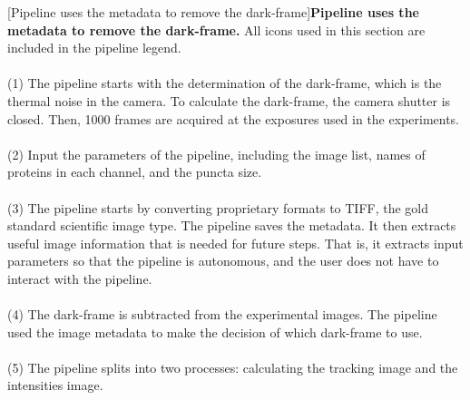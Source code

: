 \begin{centering}
\captionsetup{parbox=none}
[Pipeline uses the metadata to remove the dark-frame]{\textbf{Pipeline uses the metadata to remove the dark-frame.} All icons used in this section are included in the pipeline legend.
\\
\\
(1) The pipeline starts with the determination of the dark-frame, which is the thermal noise in the camera. To calculate the dark-frame, the camera shutter is closed. Then, 1000 frames are acquired at the exposures used in the experiments.
\\
\\
(2) Input the parameters of the pipeline, including the image list, names of proteins in each channel, and the puncta size.
\\
\\
(3) The pipeline starts by converting proprietary formats to TIFF, the gold standard scientific image type. The pipeline saves the metadata. It then extracts useful image information that is needed for future steps. That is, it extracts input parameters so that the pipeline is autonomous, and the user does not have to interact with the pipeline.
\\
\\
(4) The dark-frame is subtracted from the experimental images. The pipeline used the image metadata to make the decision of which dark-frame to use.
\\
\\
(5) The pipeline splits into two processes: calculating the tracking image and the intensities image.}
\label{m:1}
\end{centering}

